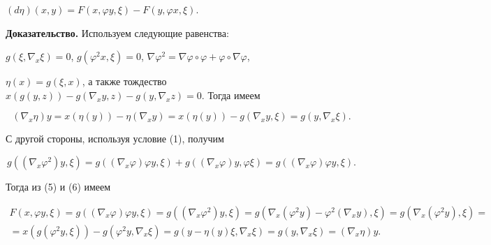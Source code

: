  


\begin{lem} 


$(d\eta)(x,y)=F(x,\varphi y,\xi)-F(y,\varphi x,\xi)$. 


\end{lem} 


 


{\bf Доказательство.} Используем следующие равенства: 


$g(\xi,\nabla_x\xi)=0$, $g(\varphi ^2x,\xi)=0$, $\nabla\varphi ^2= 


\nabla\varphi \circ\varphi +\varphi \circ\nabla\varphi $, 


$\eta(x)=g(\xi,x)$, а также тождество $x(g(y,z))-g(\nabla_x 


y,z)-g(y,\nabla_x z)=0$. Тогда имеем 


\begin{equation} 


(\nabla_x\eta)y=x(\eta(y))-\eta(\nabla_x y)= 


x(\eta(y))-g(\nabla_x y,\xi)=g(y,\nabla_x\xi). 


\end{equation} 


С другой стороны, используя условие (1), получим 


\begin{equation} 


g((\nabla_x\varphi ^2)y,\xi)=g((\nabla_x\varphi )\varphi y,\xi)+ 


g((\nabla_x\varphi )y,\varphi \xi)=g((\nabla_x\varphi )\varphi y,\xi). 


\end{equation} 


Тогда из (5) и (6) имеем 


\begin{multline*} 


F(x,\varphi y,\xi)=g((\nabla_x\varphi )\varphi y,\xi)= 


g((\nabla_x\varphi ^2)y,\xi)=g(\nabla_x(\varphi ^2y)- 


\varphi ^2(\nabla_x y),\xi)= 


g(\nabla_x(\varphi ^2y),\xi)= \\ 


% 


=x(g(\varphi ^2y,\xi))-g(\varphi ^2y,\nabla_x\xi)= 


g(y-\eta(y)\xi,\nabla_x\xi)= 


g(y,\nabla_x\xi)=(\nabla_x\eta)y. 


\end{multline*} 


